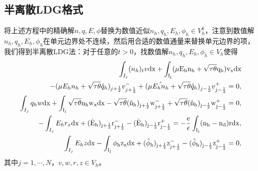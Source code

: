 \subsection{半离散LDG格式}
将上述方程中的精确解$n,q,E,\phi$替换为数值近似$n_h,q_h,E_h,\phi_h \in V_h^k$，注意到数值解$n_h,q_h,E_h,\phi_h$在单元边界处不连续，然后用合适的数值通量来替换单元边界的项，我们得到半离散LDG法：对于任意的$t>0$，找数值解$n_h,q_h,E_h,\phi_h \in V_h$使得
\begin{align}
    \int_{I_j} (n_h)_t v \rm{d}x + \int_{I_j}(\mu E_h n_h + \sqrt{\tau \theta}q_h)v_x\rm{d} x                                                               \nonumber                                                                             \\
    - (\mu E_hn_h + \sqrt{\tau \theta}\hat{q}_h)_{j+\frac{1}{2}}v_{j+\frac{1}{2}}^- +(\mu \hat{E_hn_h} + \sqrt{\tau \theta}\hat{q}_h)_{j-\frac{1}{2}}v_{j-\frac{1}{2}}^+ = 0,                                   \label{LDG:1:translation}         \\
    \int_{I_j} q_hw \rm{d}x + \int_{I_j}\sqrt{\tau \theta} n_h w_x \rm{d}x - \sqrt{\tau \theta} (\hat{n}_h)_{j+\frac{1}{2}}w_{j+\frac{1}{2}}^- + \sqrt{\tau \theta} (\hat{n}_h)_{j-\frac{1}{2}}w_{j-\frac{1}{2}}^+ = 0, \label{LDG:2:translation} \\
    -\int_{I_j}E_hr_x\rm{d}x + (\hat{E}_h)_{j+\frac{1}{2}}r_{j+\frac{1}{2}}^- - (\hat{E}_h)_{j-\frac{1}{2}}r_{j-\frac{1}{2}}^+ = -\frac{e}{\epsilon}\int_{I_j}(n_h-n_d)r\rm{d}x,                                        \label{LDG:3:translation} \\
    \int_{I_j} E_hz \rm{d}x - \int_{I_j}\phi_h z_x \rm{d}x + (\hat{\phi}_h)_{j+\frac{1}{2}}z_{j+\frac{1}{2}}^- - (\hat{\phi}_h)_{j-\frac{1}{2}}z_{j-\frac{1}{2}}^+ = 0,\label{LDG:4:translation}
\end{align}
其中$ j=1,\cdots,N$，$v,w,r,z \in V_h$。


